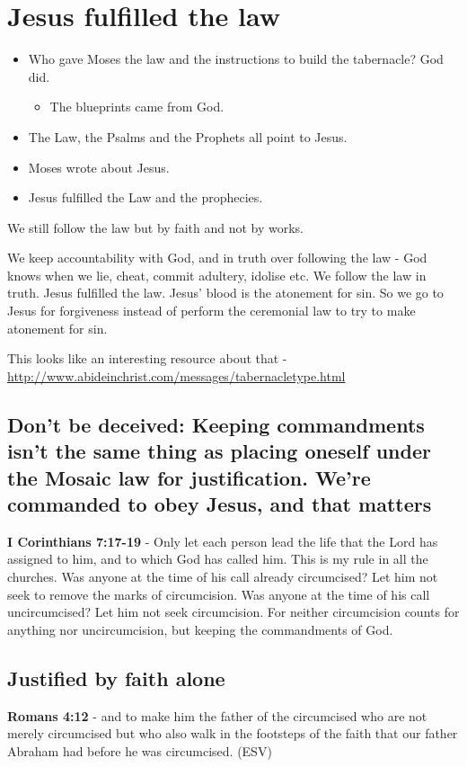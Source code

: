 \documentclass[11pt]{article}
\begin{document}
\section{Jesus fulfilled the law}
\label{sec:org033917e}
\begin{itemize}
\item Who gave Moses the law and the instructions to build the tabernacle? God did.
\begin{itemize}
\item The blueprints came from God.
\end{itemize}
\item The Law, the Psalms and the Prophets all point to Jesus.
\item Moses wrote about Jesus.
\item Jesus fulfilled the Law and the prophecies.
\end{itemize}

We still follow the law but by faith and not by works.

We keep accountability with God, and in truth over following the law - God knows when we lie, cheat, commit adultery, idolise etc.
We follow the law in truth.
Jesus fulfilled the law. Jesus' blood is the atonement for sin.
So we go to Jesus for forgiveness instead of perform the ceremonial law to try to make atonement for sin.

This looks like an interesting resource about that - \url{http://www.abideinchrist.com/messages/tabernacletype.html}

\subsection{Don't be deceived: Keeping commandments isn't the same thing as placing oneself under the Mosaic law for justification. We're commanded to obey Jesus, and that matters}
\label{sec:orgdf6273c}
\textbf{I Corinthians 7:17-19} - Only let each person lead the life that the Lord has assigned to him, and to which God has called him. This is my rule in all the churches. Was anyone at the time of his call already circumcised? Let him not seek to remove the marks of circumcision. Was anyone at the time of his call uncircumcised? Let him not seek circumcision. For neither circumcision counts for anything nor uncircumcision, but keeping the commandments of God.

\subsection{Justified by faith alone}
\label{sec:org4f9e773}
\textbf{Romans 4:12} -  and to make him the father of the circumcised who are not merely circumcised but who also walk in the footsteps of the faith that our father Abraham had before he was circumcised.  (ESV)
\end{document}
